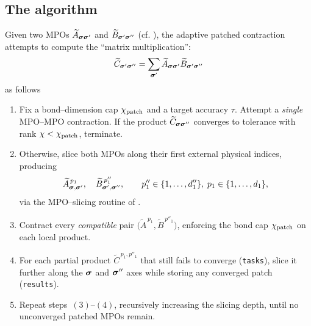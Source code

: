 \subsection{The algorithm}
Given two MPOs \(\widetilde{A}_{\boldsymbol{\sigma}\boldsymbol{\sigma}'}\) and \(\widetilde{B}_{\boldsymbol{\sigma}'\boldsymbol{\sigma}''}\) (cf. ), the adaptive patched contraction attempts to compute the ``matrix multiplication'':
\begin{equation}
    \widetilde{C}_{\boldsymbol{\sigma}'\boldsymbol{\sigma}''} = \sum_{\boldsymbol{\sigma}'} \widetilde{A}_{\boldsymbol{\sigma}\boldsymbol{\sigma}'} \widetilde{B}_{\boldsymbol{\sigma}'\boldsymbol{\sigma}''}
    \label{eq:genericAdaptiveMPOMPOContr}
\end{equation}
as follows
\begingroup
\renewcommand{\labelenumi}{(\arabic{enumi})}
\begin{enumerate}
    \item
  Fix a bond–dimension cap \(\chi_{\text{patch}}\) and a target accuracy \(\tau\).  
  Attempt a \emph{single} MPO–MPO contraction.  
  If the product \(\widetilde{C}_{\boldsymbol{\sigma}\boldsymbol{\sigma}''}\) converges to tolerance with rank \(\chi<\chi_{\text{patch}}\), terminate.
\item Otherwise, slice both MPOs along their first external physical indices,
  producing
  \begin{equation}
    \widetilde{A}_{\boldsymbol{\sigma},\boldsymbol{\sigma}'}^{\,p_{1}},
    \quad
    \widetilde{B}_{\boldsymbol{\sigma}',\boldsymbol{\sigma}''}^{\,p''_{1}},
    \qquad
    p''_{1}\in\{1,\dots,d''_{1}\},
    \;
    p_{1}\in\{1,\dots,d_{1}\},
  \end{equation}
  via the MPO–slicing routine of .
    \item Contract every \emph{compatible} pair \(\bigl(\widetilde{A}^{\,p_{1}},
          \widetilde{B}^{\,p''_{1}}\bigr)\),
  enforcing the bond cap \(\chi_{\text{patch}}\) on each local product.
\item For each partial product
  \(\widetilde{C}^{\,p_{1},p''_{1}}\) that still fails to converge (\texttt{tasks}), slice it further along the \(\boldsymbol{\sigma}\) and \(\boldsymbol{\sigma}''\) axes while storing any converged patch (\texttt{results}).
\item Repeat steps~$(3)$–$(4)$, recursively increasing the slicing depth, until no unconverged patched MPOs remain.
\end{enumerate}
\endgroup

